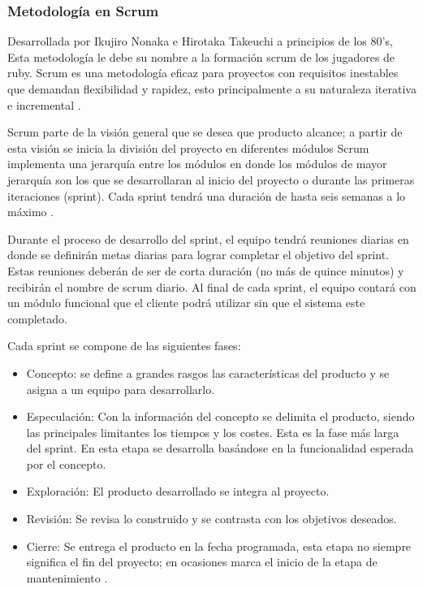 	\subsubsection{Metodología en Scrum}
Desarrollada por Ikujiro Nonaka e Hirotaka Takeuchi a principios de los 80’s, Esta metodología le debe su nombre a la formación scrum de los jugadores de ruby. Scrum es una metodología eficaz para proyectos con requisitos inestables que demandan flexibilidad y rapidez, esto principalmente a su naturaleza iterativa e incremental \cite{Ref_DefScrum}.  
\\
\par
Scrum parte de la visión general que se desea que producto alcance; a partir de esta visión se inicia la división del proyecto en diferentes módulos Scrum implementa una jerarquía entre los módulos en donde los módulos de mayor jerarquía son los que se desarrollaran al inicio del proyecto o durante las primeras iteraciones (sprint). Cada sprint tendrá una duración de hasta seis semanas a lo máximo \cite{Ref_ScrumRef}. 
\\
\par
Durante el proceso de desarrollo del sprint, el equipo tendrá reuniones diarias en donde se definirán metas diarias para lograr completar el objetivo del sprint. Estas reuniones deberán de ser de corta duración (no más de quince minutos) y recibirán el nombre de scrum diario. Al final de cada sprint, el equipo contará con un módulo funcional que el cliente podrá utilizar sin que el sistema este completado.
\\
\par
Cada sprint se compone de las siguientes fases:
\begin{itemize}
	\item Concepto: se define a grandes rasgos las características del producto y se asigna a un equipo para desarrollarlo.
	\item Especulación: Con la información del concepto se delimita el producto, siendo las principales limitantes los tiempos y los costes. Esta es la fase más larga del sprint. En esta etapa se desarrolla basándose en la funcionalidad esperada por el concepto.
	\item Exploración: El producto desarrollado se integra al proyecto.
	\item Revisión: Se revisa lo construido y se contrasta con los objetivos deseados.
	\item Cierre: Se entrega el producto en la fecha programada, esta etapa no siempre significa el fin del proyecto; en ocasiones marca el inicio de la etapa de mantenimiento \cite{Ref_ScrumGuia}. 
\end{itemize}
